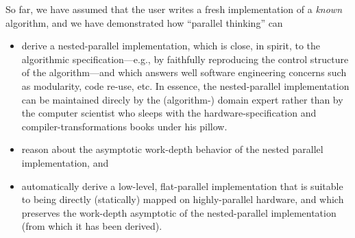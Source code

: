 \documentclass[acmsmall,review]{acmart}\settopmatter{printfolios=true,printccs=false,printacmref=false}
\begin{document}
So far, we have assumed that the user writes a fresh implementation
of a \emph{known} algorithm, and we have demonstrated how ``parallel
thinking'' can
\begin{itemize}
    \item derive a nested-parallel implementation, which is close,
        in spirit, to the algorithmic specification---e.g., by
        faithfully reproducing the control structure of the 
        algorithm---and which answers well software engineering
        concerns such as modularity, code re-use, etc. In essence, 
        the nested-parallel implementation can be maintained direcly
        by the (algorithm-) domain expert rather than by the 
        computer scientist who sleeps with the hardware-specification
        and compiler-transformations books under his pillow.
    \item reason about the asymptotic work-depth behavior of the
        nested parallel implementation, and
    \item automatically derive a low-level, flat-parallel 
        implementation that is suitable to being directly 
        (statically) mapped on highly-parallel hardware, 
        and which preserves the work-depth asymptotic of 
        the nested-parallel implementation 
        (from which it has been derived).
\end{itemize}
\end{document}
